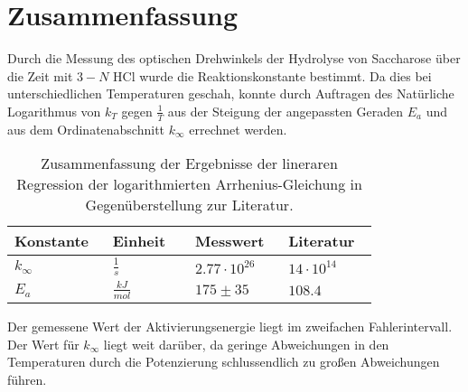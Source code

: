 

 

\section{Zusammenfassung}

Durch die Messung des optischen Drehwinkels der Hydrolyse von Saccharose über die Zeit mit $3-N$ HCl wurde die Reaktionskonstante bestimmt. Da dies bei unterschiedlichen Temperaturen geschah, konnte durch Auftragen des Natürliche Logarithmus von $k_T$ gegen $\frac{1}{T}$ aus der Steigung der angepassten Geraden $E_a$ und aus dem Ordinatenabschnitt $k_\infty$ errechnet werden. 

\begin{table}[H]
\centering
 
 
 \caption{Zusammenfassung der Ergebnisse der lineraren Regression der logarithmierten Arrhenius-Gleichung in Gegenüberstellung zur Literatur.}
\begin{tabular}{L{0.2\linewidth}L{0.2\linewidth}L{0.20\linewidth}R{0.2\linewidth}}
Konstante & Einheit & Messwert & Literatur \cite{saclit}\\
\hline \addlinespace[1ex] 
$ k_\infty$ & $ \frac{1}{s} $ & $ 2.77\cdot 10^{26}$  & $ 14 \cdot 10^{14}$\\
\addlinespace[1ex]
$ E_a $ & $ \frac{kJ}{mol} $ & $175 \pm 35$ & $108.4$\\


 \end{tabular}
 \label{tab2}
 \end{table}

Der gemessene Wert der Aktivierungsenergie liegt im zweifachen Fahlerintervall. Der Wert für $k_\infty$ liegt weit darüber, da geringe Abweichungen in den Temperaturen durch die Potenzierung schlussendlich zu großen Abweichungen führen.




